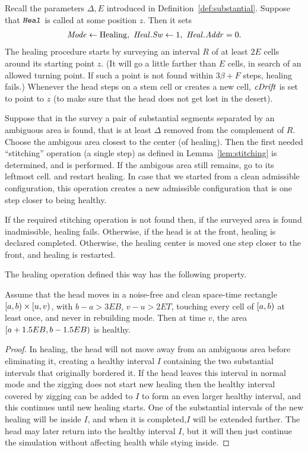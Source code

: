 \documentclass[12pt]{memoir}
\newcommand{\fld}[1]{\ensuremath{\textit{#1\/}}}
\newcommand{\rul}[1]{\ensuremath{\texttt{\slshape #1\/}}}
\def\B{B}
\newcommand{\E}{E}
\newcommand{\R}{R}
\newcommand{\Tu}{T}
\newcommand{\F}{F}
\newcommand{\z}{z}
\newcommand{\Addr}{\fld{Addr}}
\newcommand{\cDrift}{\fld{cDrift}}
\newcommand{\Mode}{\fld{Mode}}
\newcommand{\Heal}{\fld{Heal}}
\newcommand{\rHeal}{\rul{Heal}}
\newcommand{\Sweep}{\fld{Sw}}
\newcommand{\Healing}{\mathrm{Healing}}
\begin{document}
Recall the parameters \( \Delta,\E \) introduced in Definition~\ref{def:substantial}.
Suppose that \( \rHeal \) is called at some position \( \z \).
Then it sets
\begin{align*}
\Mode\gets\Healing,\ \Heal.\Sweep \gets 1,\ \Heal.\Addr = 0.
 \end{align*} 
The healing procedure starts by surveying an interval \( \R \) of at least \( 2\E \) cells 
around its starting point \( z \).
(It will go a little farther than \( \E \) cells, in search of an allowed turning point.
If such a point is not found within \( 3\beta+\F \) steps, healing fails.)
Whenever the head steps on a stem cell or creates a new cell, 
\( \cDrift \) is set to point to \( \z \) (to make sure that the head does not get
lost in the desert).

Suppose that in the survey a pair of substantial segments separated by an ambiguous area is found,
that is at least \( \Delta \) removed from the complement of \( R \). 
Choose the ambigous area closest to the center (of healing).
Then the first needed ``stitching'' operation (a single step) as defined in Lemma~\ref{lem:stitching}
is determined, and is performed.
If the ambigous area still remains, go to its leftmost cell.
and restart healing.
In case that we started from a clean admissible configuration, this operation creates a new admissible
configuration that is one step closer to being healthy.

If the required stitching operation is not found then, 
if the surveyed area is found inadmissible, healing fails.
Otherwise, if the head is at the front, healing is declared completed.
Otherwise, the healing center is moved one step closer to the front, and healing is restarted.

The healing operation defined this way has the following property.

\begin{lemma}\label{lem:combined-heals}
  Assume that the head moves in a noise-free and clean space-time rectangle \( \left[a,b\right)\times \left[u,v\right) \),
with \( b-a>3\E\B \), \( v-u>2\E\Tu \),
touching every cell of \( \left[a,b\right) \) at least once, and never in rebuilding mode.
Then at time \( v \), the area \( \lint{a+1.5\E\B}{b-1.5\E\B} \) is healthy.
\end{lemma}
\begin{proof}
In healing, the head will not move away from an ambiguous area before eliminating it, creating a healthy interval
\( I \) containing the two substantial intervals that originally bordered it.
If the head leaves this interval in normal mode and the zigging does not start new healing then the
healthy interval covered by zigging can be added to \( I \) to form an even larger healthy interval,
and this continues until new healing starts.
One of the substantial intervals of the new healing will be inside \( I \), and when it is completed,\( I \) will be
extended further.
The head may later return into the healthy interval \( I \), but it will then just continue the simulation without
affecting health while stying inside.  
\end{proof}
\end{document}
